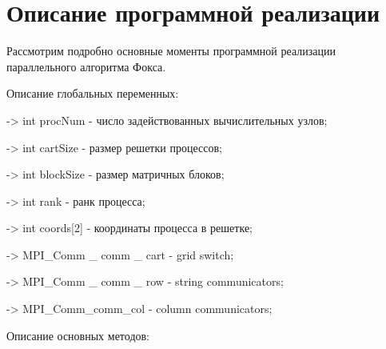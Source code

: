 \documentclass{report}
\begin{document}
\newpage

\section*{Описание программной реализации}
Рассмотрим подробно основные моменты программной реализации параллельного
алгоритма Фокса.
\par Описание глобальных переменных:
\par \quad  -> int procNum - число задействованных вычислительных узлов;
\par \quad -> int cartSize - размер решетки процессов;
\par \quad -> int blockSize - размер матричных блоков;
\par \quad -> int rank - ранк процесса;
\par \quad -> int coords[2] - координаты процесса в решетке;
\par \quad -> MPI_Comm _ comm _ cart - grid switch;
\par \quad -> MPI_Comm _ comm _ row - string communicators;
\par \quad -> MPI_Comm_comm_col - column communicators;

\par Описание основных методов:
\end{document}
